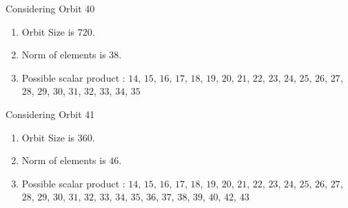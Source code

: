 \documentclass[12pt]{article}
\begin{document}
Considering Orbit 40
\begin{enumerate}
\item Orbit Size is $720$.
\item Norm of elements is $38$.
\item Possible scalar product : $14$, $15$, $16$, $17$, $18$, $19$, $20$, $21$, $22$, $23$, $24$, $25$, $26$, $27$, $28$, $29$, $30$, $31$, $32$, $33$, $34$, $35$
\end{enumerate}
Considering Orbit 41
\begin{enumerate}
\item Orbit Size is $360$.
\item Norm of elements is $46$.
\item Possible scalar product : $14$, $15$, $16$, $17$, $18$, $19$, $20$, $21$, $22$, $23$, $24$, $25$, $26$, $27$, $28$, $29$, $30$, $31$, $32$, $33$, $34$, $35$, $36$, $37$, $38$, $39$, $40$, $42$, $43$
\end{enumerate}
\end{document}
